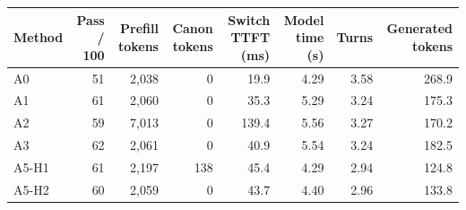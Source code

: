 \begin{tabular}{@{}lrrrrrrr@{}}
\toprule
Method & Pass / 100 & Prefill tokens & Canon tokens & Switch TTFT (ms) & Model time (s) & Turns & Generated tokens \\
\midrule
A0 & 51 & 2,038 & 0 & 19.9 & 4.29 & 3.58 & 268.9 \\
A1 & 61 & 2,060 & 0 & 35.3 & 5.29 & 3.24 & 175.3 \\
A2 & 59 & 7,013 & 0 & 139.4 & 5.56 & 3.27 & 170.2 \\
A3 & 62 & 2,061 & 0 & 40.9 & 5.54 & 3.24 & 182.5 \\
A5-H1 & 61 & 2,197 & 138 & 45.4 & 4.29 & 2.94 & 124.8 \\
A5-H2 & 60 & 2,059 & 0 & 43.7 & 4.40 & 2.96 & 133.8 \\
\bottomrule
\end{tabular}
